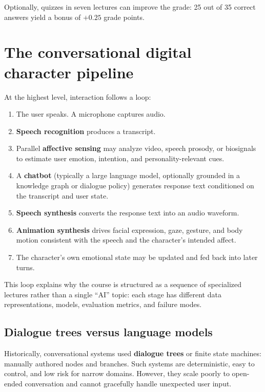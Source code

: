 Optionally, quizzes in seven lectures can improve the grade: 25 out of 35 correct answers yield a bonus of $+0.25$ grade points.

\section{The conversational digital character pipeline}

At the highest level, interaction follows a loop:

\begin{enumerate}
  \item The user speaks. A microphone captures audio.
  \item \textbf{Speech recognition} produces a transcript.
  \item Parallel \textbf{affective sensing} may analyze video, speech prosody, or biosignals to estimate user emotion, intention, and personality-relevant cues.
  \item A \textbf{chatbot} (typically a large language model, optionally grounded in a knowledge graph or dialogue policy) generates response text conditioned on the transcript and user state.
  \item \textbf{Speech synthesis} converts the response text into an audio waveform.
  \item \textbf{Animation synthesis} drives facial expression, gaze, gesture, and body motion consistent with the speech and the character's intended affect.
  \item The character's own emotional state may be updated and fed back into later turns.
\end{enumerate}

This loop explains why the course is structured as a sequence of specialized lectures rather than a single ``AI'' topic: each stage has different data representations, models, evaluation metrics, and failure modes.

\subsection{Dialogue trees versus language models}

Historically, conversational systems used \textbf{dialogue trees} or finite state machines: manually authored nodes and branches. Such systems are deterministic, easy to control, and low risk for narrow domains. However, they scale poorly to open-ended conversation and cannot gracefully handle unexpected user input.

